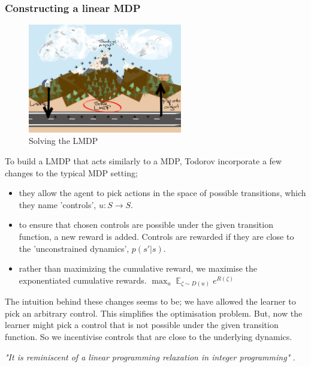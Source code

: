 \subsubsection{Constructing a linear MDP}

\begin{figure}[h!]
  \centering
  \includegraphics[width=0.6\textwidth,height=0.3\textheight]{../../pictures/drawings/abstract-representations-solve.png}
  \caption{Solving the LMDP}
\end{figure}

To build a LMDP that acts similarly to a MDP, Todorov \cite{Todorov2006} incorporate a few changes to the typical MDP setting;

\begin{itemize}
\tightlist
  \item
  they allow the agent to pick actions in the space of possible transitions, which they name 'controls', $u: S \to S$.
  \item
  to ensure that chosen controls are possible under the given transition function, a new reward is added.
  Controls are rewarded if they are close to the 'unconstrained dynamics', $p(s' | s)$.
  \item
  rather than maximizing the cumulative reward, we maximise the exponentiated cumulative rewards.
  $\mathop{\text{max}}_{u} \mathop{\mathbb E}_{\zeta \sim D(u)} e^{R(\zeta)}$ \cite{EricWarrenFox2016}
\end{itemize}

The intuition behind these changes seems to be; we have allowed the learner to pick an arbitrary control.
This simplifies the optimisation problem. But, now the learner might pick a control that is not possible
under the given transition function. So we incentivise controls that are close to the underlying dynamics.

\begin{displayquote}
\textit{"It is reminiscent of a linear programming relaxation in integer programming"} \cite{Todorov2009}.
\end{displayquote}

